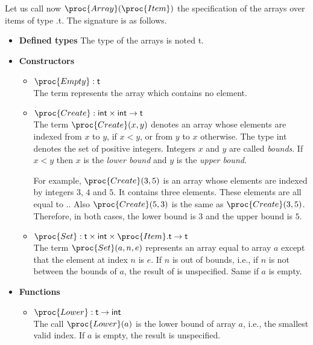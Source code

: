 \documentclass[11pt,a4paper]{article}
\newcommand\type[1]{\textsf{#1}}
\begin{document}
\noindent Let us call now \(\proc{Array}(\proc{Item})\) the
specification of the arrays over items of type
.\type{t}. The signature is as follows.
\begin{itemize}

  \item \textbf{Defined types}
  The type of the arrays is noted \type{t}.

  \item \textbf{Constructors}
  \begin{itemize}

    \item \(\proc{Empty} : \type{t}\)\\
    The term  represents the array which contains no
    element.

    \item \(\proc{Create} : \type{int} \times \type{int} \rightarrow
    \type{t}\)\\ 
    The term \(\proc{Create} (x, y)\) denotes an array whose
    elements are indexed from \(x\) to \(y\), if \(x < y\),
    or from \(y\) to \(x\) otherwise. The type \type{int} denotes
    the set of positive integers. Integers \(x\) and \(y\) are
    called \emph{bounds}. If \(x < y\) then \(x\) is the
    \emph{lower bound} and \(y\) is the \emph{upper bound}.

    For example, \(\proc{Create}(3, 5)\) is an array whose elements
    are indexed by integers \(3\), \(4\) and \(5\). It contains three
    elements. These elements are all equal to
    .. Also \(\proc{Create} (5, 3)\) is the
    same as \(\proc{Create} (3, 5)\). Therefore, in both cases, the
    lower bound is \(3\) and the upper bound is \(5\).

    \item \(\proc{Set} : \type{t} \times \type{int} \times
    \proc{Item}.\type{t} \rightarrow \type{t}\)\\
    The term \(\proc{Set} (a, n, e)\) represents an
    array equal to array \(a\) except that the element at index
    \(n\) is \(e\). If \(n\) is out of bounds, i.e., if \(n\) is
    not between the bounds of \(a\), the result of  is
    unspecified. Same if \(a\) is empty.

  \end{itemize}

  \item \textbf{Functions}
  \begin{itemize}
  
    \item \(\proc{Lower} : \type{t} \rightarrow \type{int}\)\\
    The call \(\proc{Lower} (a)\) is the lower bound of array
    \(a\), i.e., the smallest valid index. If \(a\) is empty, the
    result is unspecified.


\end{itemize}
\end{itemize}
\end{document}
